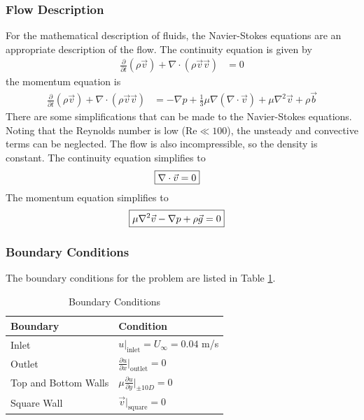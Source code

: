\subsubsection{Flow Description}
For the mathematical description of fluids, the Navier-Stokes equations are an appropriate description of the flow. The continuity equation is given by
\begin{align*}
    \frac{\partial}{\partial t} (\rho \vec{v}) + \nabla \cdot (\rho \vec{v} \vec{v}) &= 0
\end{align*}
the momentum equation is 
\begin{align*}
    \frac{\partial}{\partial t} (\rho \vec{v}) + \nabla \cdot (\rho \vec{v} \vec{v}) &= -\nabla p + \frac{1}{3} \mu \nabla (\nabla \cdot \vec{v}) + \mu \nabla^2 \vec{v} + \rho \vec{b}
\end{align*}
There are some simplifications that can be made to the Navier-Stokes equations. Noting that the Reynolds number is low ($\text{Re} \ll 100$), the unsteady and convective terms can be neglected. The flow is also incompressible, so the density is constant. The continuity equation simplifies to
\begin{align*}
    \Aboxed{\nabla \cdot \vec{v} &= 0}
\end{align*}
The momentum equation simplifies to
\begin{align*}
    \Aboxed{\mu \nabla^2 \vec{v} - \nabla p + \rho \vec{g} &= 0}
\end{align*}

\subsubsection{Boundary Conditions}
The boundary conditions for the problem are listed in Table \ref{tab:boundary_conditions}.
\begin{table}[H]
    \centering
    \caption{Boundary Conditions}
    \label{tab:boundary_conditions}
    \begin{tabular}{ll}
        \toprule
        Boundary & Condition \\
        \midrule
        Inlet & $\displaystyle u|_{\text{inlet}} = U_\infty = 0.04$ m/s \\[2ex]
        Outlet & $\displaystyle \frac{\partial u}{\partial x}\bigg|_{\text{outlet}} = 0$ \\[2ex]
        Top and Bottom Walls & $\displaystyle \mu \frac{\partial u}{\partial y}\bigg|_{\pm 10D} = 0$ \\[2ex]
        Square Wall & $\displaystyle \vec{v}|_{\text{square}} = 0$ \\
        \bottomrule
    \end{tabular}
\end{table}

